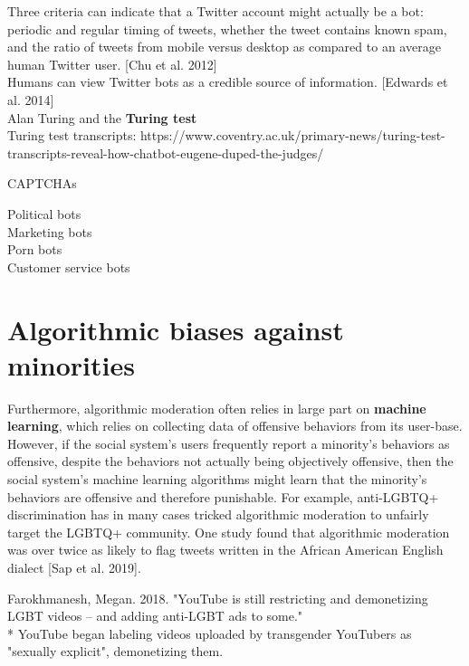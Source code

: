 \documentclass[class=book, crop=false]{standalone}
\providecommand{\keyterm}[1]{\textbf{#1}\marginnote{\scriptsize \textbf{#1}}}
\begin{document}
Three criteria can indicate that a Twitter account might actually be a bot: periodic and regular timing of tweets, whether the tweet contains known spam, and the ratio of tweets from mobile versus desktop as compared to an average human Twitter user. [Chu et al. 2012]\\

Humans can view Twitter bots as a credible source of information. [Edwards et al. 2014]\\

Alan Turing and the \keyterm{Turing test}\\
Turing test transcripts: https://www.coventry.ac.uk/primary-news/turing-test-transcripts-reveal-how-chatbot-eugene-duped-the-judges/

CAPTCHAs

Political bots\\

Marketing bots\\

Porn bots\\

Customer service bots

\section{Algorithmic biases against minorities}

Furthermore, algorithmic moderation often relies in large part on \keyterm{machine learning}, which relies on collecting data of offensive behaviors from its user-base. However, if the social system's users frequently report a minority's behaviors as offensive, despite the behaviors not actually being objectively offensive, then the social system's machine learning algorithms might learn that the minority's behaviors are offensive and therefore punishable. For example, anti-LGBTQ+ discrimination has in many cases tricked algorithmic moderation to unfairly target the LGBTQ+ community. One study found that algorithmic moderation was over twice as likely to flag tweets written in the African American English dialect [Sap et al. 2019].

Farokhmanesh, Megan. 2018. "YouTube is still restricting and demonetizing LGBT videos -- and adding anti-LGBT ads to some."\\
 * YouTube began labeling videos uploaded by transgender YouTubers as "sexually explicit", demonetizing them.
\end{document}
